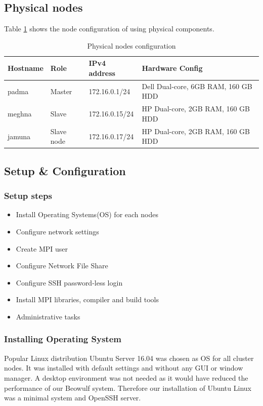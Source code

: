 \subsection{Physical nodes}
Table \ref{tab:phy_node_conf} shows the node configuration of using physical components. 
\begin{table}[!htb]
\centering
\caption{Physical nodes configuration}
\begin{tabular}{|l|l|l|l|}
\hline
Hostname & Role & IPv4 address & Hardware Config \\ \hline
padma & Master & 172.16.0.1/24 & Dell Dual-core, 6GB RAM, 160 GB HDD \\ \hline
meghna & Slave & 172.16.0.15/24 & HP Dual-core, 2GB RAM, 160 GB HDD \\ \hline
jamuna & Slave node & 172.16.0.17/24 & HP Dual-core, 2GB RAM, 160 GB HDD \\ \hline
\end{tabular}
\label{tab:phy_node_conf}
\end{table}

\afterpage{\clearpage}

\subsection{Setup \& Configuration}
\subsubsection{Setup steps}
\begin{itemize}
	\item Install Operating Systems(OS) for each nodes
	\item Configure network settings
	\item Create MPI user
	\item Configure Network File Share
	\item Configure SSH password-less login
	\item Install MPI libraries, compiler and build tools
	\item Administrative tasks
\end{itemize}

\subsubsection{Installing Operating System} 
Popular Linux distribution Ubuntu Server 16.04 was chosen as OS for all cluster nodes. It was installed with default settings and without any GUI or window manager. A desktop environment was not needed as it would have reduced the performance of our Beowulf system. Therefore our installation of Ubuntu Linux was a minimal system and OpenSSH server.

